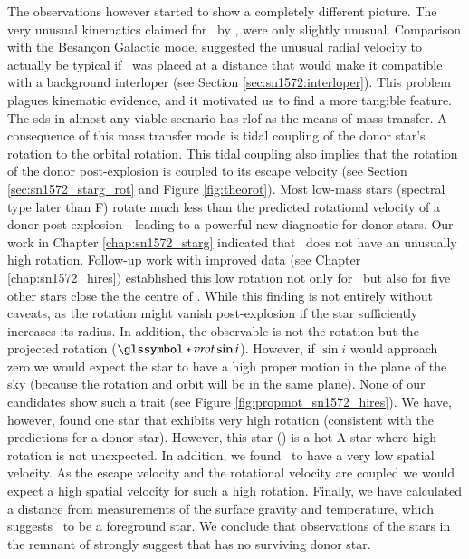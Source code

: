 The observations however started to show a completely different picture. The very unusual kinematics claimed for \starg\  by \citet{2004Natur.431.1069R}, were only slightly unusual. Comparison with the Besan\c{c}on Galactic model suggested the unusual radial velocity to actually be typical if \starg\ was placed at a distance that would make it compatible with a background interloper (see Section \vref{sec:sn1572:interloper}). This problem plagues kinematic evidence, and it motivated us to find a more tangible feature. The \gls{sds} in almost any viable scenario has \gls{rlof} as the means of mass transfer. A consequence of this mass transfer mode is tidal coupling of the donor star's rotation to the orbital rotation. This tidal coupling also implies that the rotation of the donor post-explosion is coupled to its escape velocity (see Section \vref{sec:sn1572_starg_rot} and Figure \vref{fig:theorot}). Most low-mass stars (spectral type later than F) rotate much less than the predicted rotational velocity of a donor post-explosion - leading to a powerful new diagnostic for donor stars. Our work in Chapter \ref{chap:sn1572_starg} indicated that \starg\ does not have an unusually high rotation. Follow-up work with improved data (see Chapter \ref{chap:sn1572_hires}) established this low rotation not only for \starg\ but also for five other stars close the the centre of . While this finding is not entirely without caveats, as the rotation might vanish post-explosion if the star sufficiently increases its radius. In addition, the observable is not the rotation but the projected rotation ($\vrot\sin{i}$). However, if $\sin{i}$ would approach zero we would expect the star to have a high proper motion in the plane of the sky (because the rotation and orbit will be in the same plane). None of our candidates show such a trait (see Figure \vref{fig:propmot_sn1572_hires}). 
We have, however, found one star that exhibits very high rotation (consistent with the predictions for a donor star). However, this star (\starb) is a hot A-star where high rotation is not unexpected. In addition, we found \starb\ to have a very low spatial velocity. As the escape velocity and the rotational velocity are coupled we would expect a high spatial velocity for such a high rotation. Finally, we have calculated a distance from measurements of the surface gravity and temperature, which suggests \starb\ to be a foreground star. We conclude that observations of the stars in the remnant of  strongly suggest that  has no surviving \gls*{donor} star. 

